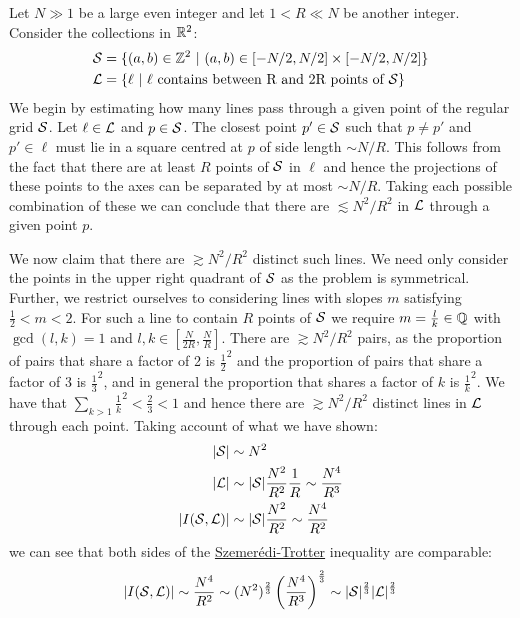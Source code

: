 \begin{example}
    Let $N \gg 1$ be a large even integer and let $1<R \ll N$ be another integer. Consider the collections in $\mathbb R^2$:
    \begin{align*}
        \mathcal S &= \{ (a,b) \in \mathbb Z^2 \ | \ (a,b) \in [-N/2,N/2] \times [-N/2,N/2] \} \\
        \mathcal L &= \{ \ell \ | \ \ell \text{ contains between R and 2R points of } \mathcal S \} \end{align*}
    We begin by estimating how many lines pass through a given point of the regular grid $\mathcal S$.
    Let $\ell \in \mathcal L$ and $p \in \mathcal S$. The closest point $p' \in \mathcal S$ such that $p \neq p'$ and $p' \in \ell$ must lie
    in a square centred at $p$ of side length $\sim N/R$. This follows from the fact that there are at least $R$ points of $\mathcal S$ in $\ell$ and hence the
    projections of these points to the axes can be separated by at most $\sim N/R$. Taking each possible combination of these we can conclude that there are $\lesssim N^2 / R^2$ in $\mathcal L$ through a
    given point $p$.

    We now claim that there are $\gtrsim N^2 / R^2$ distinct such lines. We need only consider the points in the upper right quadrant of $\mathcal S$ as the problem is symmetrical.
    Further, we restrict ourselves to considering lines with slopes $m$ satisfying $\frac{1}{2} < m < 2$. For such a line to contain $R$  points
    of $\mathcal S$ we require $m= \frac{l}{k} \in \mathbb Q$ with $\gcd(l,k) =1$ and $l,k \in \left[\frac{N}{2R}, \frac{N}{R} \right]$. There are $\gtrsim N^2/R^2$ pairs, as the proportion of pairs that share a factor of 2 is $\frac{1}{2}^2$ and the proportion of pairs that share a factor 
    of 3 is $\frac{1}{3}^2$, and in general the proportion that shares a factor of $k$ is $\frac{1}{k}^2$. We have that $\sum_{k>1} \frac{1}{k}^2 < \frac{2}{3} < 1$ and hence there are $\gtrsim N^2 /R^2$ distinct
    lines in $\mathcal L$ through each point. Taking account of what we have shown: 
    \begin{align*}
        |\mathcal S| &\sim N^2 \\ 
        |\mathcal L| &\sim |\mathcal S| \frac{N^2}{R^2} \frac{1}{R} \sim \frac{N^4}{R^3}\\
        |I(\mathcal S, \mathcal L)| &\sim |\mathcal S| \frac{N^2}{R^2} \sim \frac{N^4}{R^2}\\
    \end{align*}
    we can see that both sides of the \hyperref[thm:S-T]{Szemerédi-Trotter} inequality are comparable:
    \[
    |I(\mathcal S, \mathcal L)| \sim \frac{N^4}{R^2} \sim (N^2)^{\frac{2}{3}} \left(\frac{N^4}{R^3}\right)^{\frac{2}{3}} \sim |\mathcal S|^{\frac{2}{3}}|\mathcal L|^{\frac{2}{3}}
    \]
\end{example}



